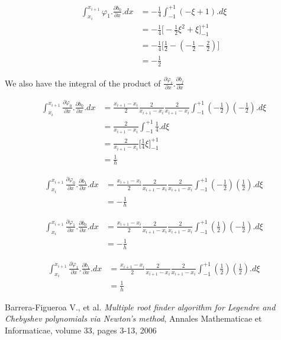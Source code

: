 \documentclass[11pt,letterpaper,titlepage]{article}
\numberwithin{equation}{section}
\newcommand{\beq}{\begin{equation*}
\begin{aligned}}
\newcommand{\eeq}{\end{aligned}
\end{equation*}}
\begin{document}
\begin{appendices}
\beq
\int_{x_i}^{x_{i+1}} \varphi_1.\frac{\partial b_0}{\partial x}.dx 
&=-\frac{1}{4}\int_{-1}^{+1} (-\xi +1).d\xi \\
&=-\frac{1}{4} \biggr[ -\frac{1}{2}\xi^2 + \xi   \biggr]_{-1}^{+1}\\
&=-\frac{1}{4} \biggr[ \frac{1}{2} - ( -\frac{1}{2} -\frac{2}{2})  \biggr] \\
&=-\frac{1}{2}
\eeq     

We also have the integral of the product of $\frac{\partial \varphi_i}{\partial x}.\frac{\partial b_j}{\partial x}$

\beq
\int_{x_i}^{x_{i+1}}\frac{\partial \varphi_0}{\partial x}.\frac{\partial b_0}{\partial x}.dx 
&= \frac{x_{i+1}-x_i}{2} \frac{2}{x_{i+1}-x_i} \frac{2}{x_{i+1}-x_i} \int_{-1}^{+1} (-\frac{1}{2})(-\frac{1}{2}).d\xi \\
&= \frac{2}{x_{i+1}-x_i} \int_{-1}^{+1} \frac{1}{4}.d\xi \\
&= \frac{2}{x_{i+1}-x_i} \biggr[ \frac{1}{4}\xi \biggr]_{-1}^{+1} \\
&= \frac{1}{h}
\eeq 

\beq
\int_{x_i}^{x_{i+1}}\frac{\partial \varphi_0}{\partial x}.\frac{\partial b_1}{\partial x}.dx 
&= \frac{x_{i+1}-x_i}{2} \frac{2}{x_{i+1}-x_i} \frac{2}{x_{i+1}-x_i} \int_{-1}^{+1} (-\frac{1}{2})(\frac{1}{2}).d\xi \\
&= -\frac{1}{h}
\eeq 

\beq
\int_{x_i}^{x_{i+1}}\frac{\partial \varphi_1}{\partial x}.\frac{\partial b_0}{\partial x}.dx 
&= \frac{x_{i+1}-x_i}{2} \frac{2}{x_{i+1}-x_i} \frac{2}{x_{i+1}-x_i} \int_{-1}^{+1} (\frac{1}{2})(-\frac{1}{2}).d\xi \\
&= -\frac{1}{h}
\eeq     

\beq
\int_{x_i}^{x_{i+1}}\frac{\partial \varphi_1}{\partial x}.\frac{\partial b_1}{\partial x}.dx 
&= \frac{x_{i+1}-x_i}{2} \frac{2}{x_{i+1}-x_i} \frac{2}{x_{i+1}-x_i} \int_{-1}^{+1} (\frac{1}{2})(\frac{1}{2}).d\xi \\
&= \frac{1}{h}
\eeq    
    
\end{appendices}

\newpage
{}
\begin{thebibliography}{1}
    
     Barrera-Figueroa V., et al. {\em Multiple root finder algorithm for Legendre and Chebyshev polynomials via Newton’s method}, Annales Mathematicae et Informaticae, volume 33, pages 3-13, 2006
    
    
\end{thebibliography}

    
    
    
    
\end{document}
